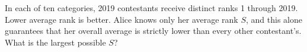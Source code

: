 In each of ten categories, 2019 contestants receive distinct ranks 1 through 2019. Lower average rank is better. Alice knows only her average rank $ S $, and this alone guarantees that her overall average is strictly lower than every other contestant's. What is the largest possible $ S $?
